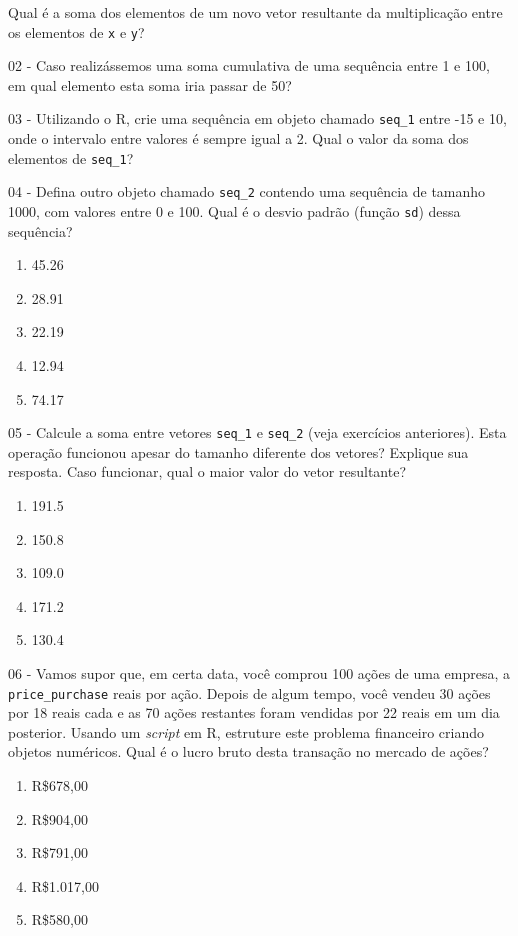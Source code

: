 \documentclass[
  11pt,
]{book}
\providecommand{\tightlist}{%
  \setlength{\itemsep}{0pt}\setlength{\parskip}{0pt}}
\begin{document}
Qual é a soma dos elementos de um novo vetor resultante da multiplicação entre os elementos de \texttt{x} e \texttt{y}?

02 -
Caso realizássemos uma soma cumulativa de uma sequência entre 1 e 100, em qual elemento esta soma iria passar de 50?

03 -
Utilizando o R, crie uma sequência em objeto chamado \texttt{seq\_1} entre -15 e 10, onde o intervalo entre valores é sempre igual a 2. Qual o valor da soma dos elementos de \texttt{seq\_1}?

04 -
Defina outro objeto chamado \texttt{seq\_2} contendo uma sequência de tamanho 1000, com valores entre 0 e 100. Qual é o desvio padrão (função \texttt{sd}) dessa sequência?

\begin{enumerate}
\def\labelenumi{\alph{enumi})}
\tightlist
\item
  45.26
\item
  28.91
\item
  22.19
\item
  12.94
\item
  74.17
\end{enumerate}

05 -
Calcule a soma entre vetores \texttt{seq\_1} e \texttt{seq\_2} (veja exercícios anteriores). Esta operação funcionou apesar do tamanho diferente dos vetores? Explique sua resposta. Caso funcionar, qual o maior valor do vetor resultante?

\begin{enumerate}
\def\labelenumi{\alph{enumi})}
\tightlist
\item
  191.5
\item
  150.8
\item
  109.0
\item
  171.2
\item
  130.4
\end{enumerate}

06 -
Vamos supor que, em certa data, você comprou 100 ações de uma empresa, a \texttt{price\_purchase} reais por ação. Depois de algum tempo, você vendeu 30 ações por 18 reais cada e as 70 ações restantes foram vendidas por 22 reais em um dia posterior. Usando um \emph{script} em R, estruture este problema financeiro criando objetos numéricos. Qual é o lucro bruto desta transação no mercado de ações?

\begin{enumerate}
\def\labelenumi{\alph{enumi})}
\tightlist
\item
  R\$678,00
\item
  R\$904,00
\item
  R\$791,00
\item
  R\$1.017,00
\item
  R\$580,00
\end{enumerate}
\end{document}
